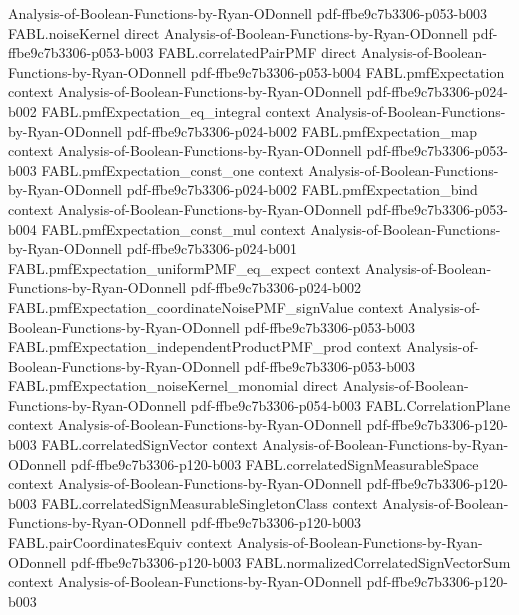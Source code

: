 \begin{theorem}
  {Analysis-of-Boolean-Functions-by-Ryan-ODonnell}
  {pdf-ffbe9c7b3306-p053-b003}
\proofstep
  {FABL.noiseKernel}
  {direct}
  {Analysis-of-Boolean-Functions-by-Ryan-ODonnell}
  {pdf-ffbe9c7b3306-p053-b003}
\proofstep
  {FABL.correlatedPairPMF}
  {direct}
  {Analysis-of-Boolean-Functions-by-Ryan-ODonnell}
  {pdf-ffbe9c7b3306-p053-b004}
\proofstep
  {FABL.pmfExpectation}
  {context}
  {Analysis-of-Boolean-Functions-by-Ryan-ODonnell}
  {pdf-ffbe9c7b3306-p024-b002}
\proofstep
  {FABL.pmfExpectation_eq_integral}
  {context}
  {Analysis-of-Boolean-Functions-by-Ryan-ODonnell}
  {pdf-ffbe9c7b3306-p024-b002}
\proofstep
  {FABL.pmfExpectation_map}
  {context}
  {Analysis-of-Boolean-Functions-by-Ryan-ODonnell}
  {pdf-ffbe9c7b3306-p053-b003}
\proofstep
  {FABL.pmfExpectation_const_one}
  {context}
  {Analysis-of-Boolean-Functions-by-Ryan-ODonnell}
  {pdf-ffbe9c7b3306-p024-b002}
\proofstep
  {FABL.pmfExpectation_bind}
  {context}
  {Analysis-of-Boolean-Functions-by-Ryan-ODonnell}
  {pdf-ffbe9c7b3306-p053-b004}
\proofstep
  {FABL.pmfExpectation_const_mul}
  {context}
  {Analysis-of-Boolean-Functions-by-Ryan-ODonnell}
  {pdf-ffbe9c7b3306-p024-b001}
\proofstep
  {FABL.pmfExpectation_uniformPMF_eq_expect}
  {context}
  {Analysis-of-Boolean-Functions-by-Ryan-ODonnell}
  {pdf-ffbe9c7b3306-p024-b002}
\proofstep
  {FABL.pmfExpectation_coordinateNoisePMF_signValue}
  {context}
  {Analysis-of-Boolean-Functions-by-Ryan-ODonnell}
  {pdf-ffbe9c7b3306-p053-b003}
\proofstep
  {FABL.pmfExpectation_independentProductPMF_prod}
  {context}
  {Analysis-of-Boolean-Functions-by-Ryan-ODonnell}
  {pdf-ffbe9c7b3306-p053-b003}
\proofstep
  {FABL.pmfExpectation_noiseKernel_monomial}
  {direct}
  {Analysis-of-Boolean-Functions-by-Ryan-ODonnell}
  {pdf-ffbe9c7b3306-p054-b003}
\proofstep
  {FABL.CorrelationPlane}
  {context}
  {Analysis-of-Boolean-Functions-by-Ryan-ODonnell}
  {pdf-ffbe9c7b3306-p120-b003}
\proofstep
  {FABL.correlatedSignVector}
  {context}
  {Analysis-of-Boolean-Functions-by-Ryan-ODonnell}
  {pdf-ffbe9c7b3306-p120-b003}
\proofstep
  {FABL.correlatedSignMeasurableSpace}
  {context}
  {Analysis-of-Boolean-Functions-by-Ryan-ODonnell}
  {pdf-ffbe9c7b3306-p120-b003}
\proofstep
  {FABL.correlatedSignMeasurableSingletonClass}
  {context}
  {Analysis-of-Boolean-Functions-by-Ryan-ODonnell}
  {pdf-ffbe9c7b3306-p120-b003}
\proofstep
  {FABL.pairCoordinatesEquiv}
  {context}
  {Analysis-of-Boolean-Functions-by-Ryan-ODonnell}
  {pdf-ffbe9c7b3306-p120-b003}
\proofstep
  {FABL.normalizedCorrelatedSignVectorSum}
  {context}
  {Analysis-of-Boolean-Functions-by-Ryan-ODonnell}
  {pdf-ffbe9c7b3306-p120-b003}

\end{theorem}
